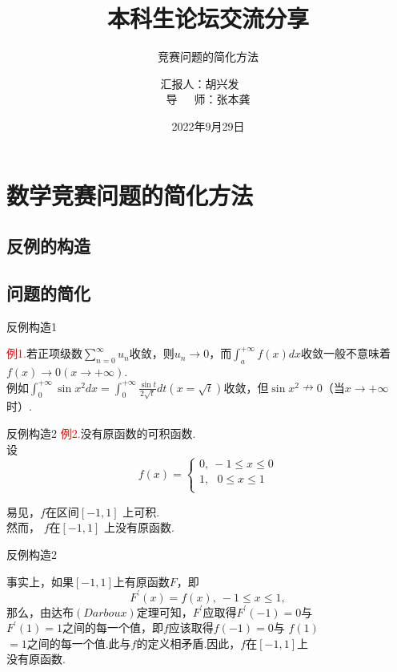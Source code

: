 \documentclass{beamer}
\author{汇报人：胡兴发\ \ \ \\导\ \ \ 师：张本龚} %
\title{本科生论坛交流分享} %
\subtitle{竞赛问题的简化方法} %
\institute{数理科学学院}
\date{2022年9月29日} %
\institute[IaHS]{}
\begin{document}
\kaishu
\begin{frame}
    \titlepage
\end{frame}






\section{数学竞赛问题的简化方法}
\subsection{反例的构造}
\subsection{问题的简化}


\begin{frame}{反例构造1}
\begin{spacing}{2.0}
\textcolor{red}{例1.}若正项级数$\sum\limits_{n=0}^{\infty}u_n$收敛，则$u_n\to 0$，而$\int_{a}^{+\infty}f(x)dx $收敛一般不意味着$f(x)\to 0(x\to  +\infty)$.\\ \vspace{.5cm}例如$\int_{0}^{+\infty}\sin x^2dx =  \int_{0}^{+\infty} \frac{\sin t}{2\sqrt t}dt(x=\sqrt t)$收敛，但$\sin x^2\nrightarrow 0$（当$x\to +\infty$时）.
	\end{spacing}
\end{frame}

\begin{frame}{反例构造2}
		\textcolor{red}{例2.}没有原函数的可积函数.\\
		设
		$$
		f\left( x \right) =\left\{ 
			\begin{array}{l}
			0,\ -1\le x\le 0\\
			1,\ \ \ 0\le x\le 1\\
			\end{array} \right. 
		$$
		
		
		$
		\text{易见，}
		f
		\text{在区间}\left[ -1,1 \right] 
		$
		上可积.\\然而，
		$
		f\text{在}\left[ -1,1 \right] 
		$
		上没有原函数.
\end{frame}
\begin{frame}{反例构造2}
	\begin{spacing}{1.5}
		
事实上，如果$\left[ -1,1 \right] \text{上有原函数}F\text{，即}$
$$F^{'}\left( x \right) =f\left( x \right) ,\ -1\le x\le 1,$$
那么，由达布$\left( Darboux \right)$定理可知，$F^{'}$应取得$F^{'}\left( -1 \right) =0$与\\
$F^{'}\left( 1 \right)=1$之间的每一个值，即$f$应该取得$f\left( -1 \right) =0$与
$f\left( 1 \right)$\\
$=1$之间的每一个值.此与$f$的定义相矛盾.因此，$f\text{在}\left[ -1,1 \right] $上\\
没有原函数.

\end{spacing}
\end{frame}
\end{document}
